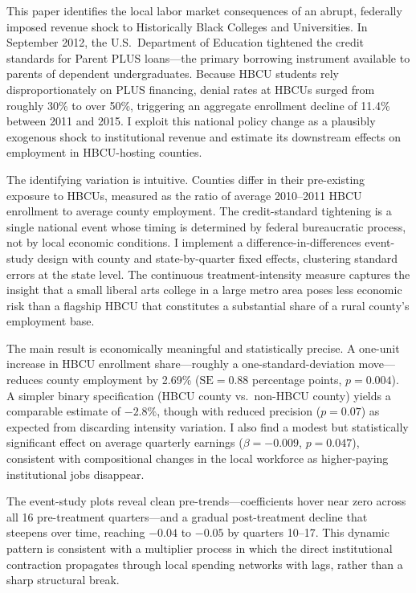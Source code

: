 \documentclass[12pt]{article}
\begin{document}
This paper identifies the local labor market consequences of an abrupt, federally imposed revenue shock to Historically Black Colleges and Universities. In September 2012, the U.S.\ Department of Education tightened the credit standards for Parent PLUS loans---the primary borrowing instrument available to parents of dependent undergraduates. Because HBCU students rely disproportionately on PLUS financing, denial rates at HBCUs surged from roughly 30\% to over 50\%, triggering an aggregate enrollment decline of 11.4\% between 2011 and 2015. I exploit this national policy change as a plausibly exogenous shock to institutional revenue and estimate its downstream effects on employment in HBCU-hosting counties.

The identifying variation is intuitive. Counties differ in their pre-existing exposure to HBCUs, measured as the ratio of average 2010--2011 HBCU enrollment to average county employment. The credit-standard tightening is a single national event whose timing is determined by federal bureaucratic process, not by local economic conditions. I implement a difference-in-differences event-study design with county and state-by-quarter fixed effects, clustering standard errors at the state level. The continuous treatment-intensity measure captures the insight that a small liberal arts college in a large metro area poses less economic risk than a flagship HBCU that constitutes a substantial share of a rural county's employment base.

The main result is economically meaningful and statistically precise. A one-unit increase in HBCU enrollment share---roughly a one-standard-deviation move---reduces county employment by 2.69\% ($\text{SE} = 0.88$ percentage points, $p = 0.004$). A simpler binary specification (HBCU county vs.\ non-HBCU county) yields a comparable estimate of $-2.8\%$, though with reduced precision ($p = 0.07$) as expected from discarding intensity variation. I also find a modest but statistically significant effect on average quarterly earnings ($\beta = -0.009$, $p = 0.047$), consistent with compositional changes in the local workforce as higher-paying institutional jobs disappear.

The event-study plots reveal clean pre-trends---coefficients hover near zero across all 16 pre-treatment quarters---and a gradual post-treatment decline that steepens over time, reaching $-0.04$ to $-0.05$ by quarters 10--17. This dynamic pattern is consistent with a multiplier process in which the direct institutional contraction propagates through local spending networks with lags, rather than a sharp structural break.
\end{document}
